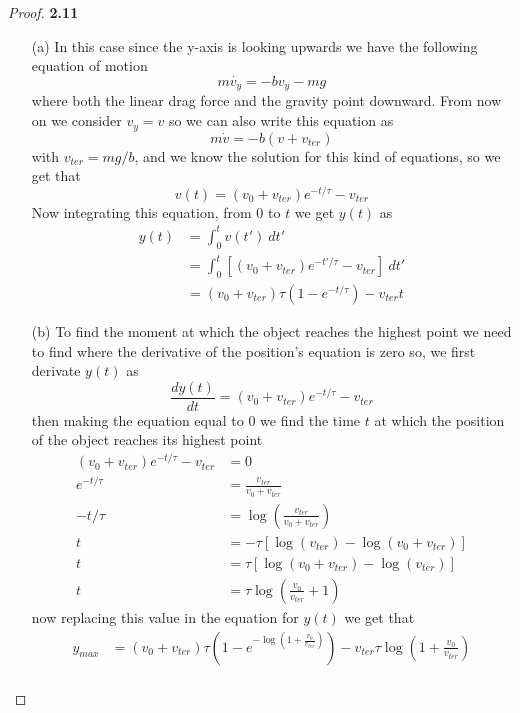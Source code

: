 \documentclass[11pt]{article}
\theoremstyle{definition}
\begin{document}
	\begin{proof}{\textbf{2.11}}
        \begin{itemize}
        \item[(a)] In this case since the y-axis is looking upwards we have the
        following equation of motion
        $$m\dot{v_y} = -bv_y - mg$$
        where both the linear drag force and the gravity point downward. From
        now on we consider $v_y = v$ so we can also write this equation as
        $$m\dot{v} = -b(v + v_{ter})$$
        with $v_{ter} = mg/b$, and we know the solution for this kind of
        equations, so we get that
        $$v(t) = (v_{0} + v_{ter})e^{-t/\tau} - v_{ter}$$
        Now integrating this equation, from $0$ to $t$ we get $y(t)$ as
        \begin{align*}
            y(t) &= \int_0^tv(t')~dt'\\
                 &= \int_0^t [(v_{0} + v_{ter})e^{-t'/\tau} - v_{ter}]~dt'\\
                 &= (v_{0} + v_{ter})\tau (1 - e^{-t/\tau}) - v_{ter}t
        \end{align*}
        \item[(b)] To find the moment at which the object reaches the highest
        point we need to find where the derivative of the position's equation
        is zero so, we first derivate $y(t)$ as
        $$\frac{dy(t)}{dt} = (v_0 + v_{ter})e^{-t/\tau} - v_{ter}$$
        then making the equation equal to 0 we find the time $t$ at which the
        position of the object reaches its highest point
        \begin{align*}
            (v_0 + v_{ter})e^{-t/\tau} - v_{ter} &= 0 \\
            e^{-t/\tau} &= \frac{v_{ter}}{v_0 + v_{ter}} \\
            -t/\tau &= \log\left(\frac{v_{ter}}{v_0 + v_{ter}}\right) \\
             t &= -\tau [\log(v_{ter}) - \log(v_0 + v_{ter})] \\
             t &= \tau [\log(v_0 + v_{ter}) - \log(v_{ter})] \\
             t &= \tau \log\left(\frac{v_0}{v_{ter}} + 1\right)
        \end{align*}
        now replacing this value in the equation for $y(t)$ we get that
        \begin{align*}
            y_{max} &= (v_{0} + v_{ter})\tau (1 - e^{-\log(1 + \frac{v_0}{v_{ter}})}) - v_{ter}\tau \log\left(1 + \frac{v_0}{v_{ter}}\right)\\

\end{align*}
\end{itemize}
\end{proof}
\end{document}

